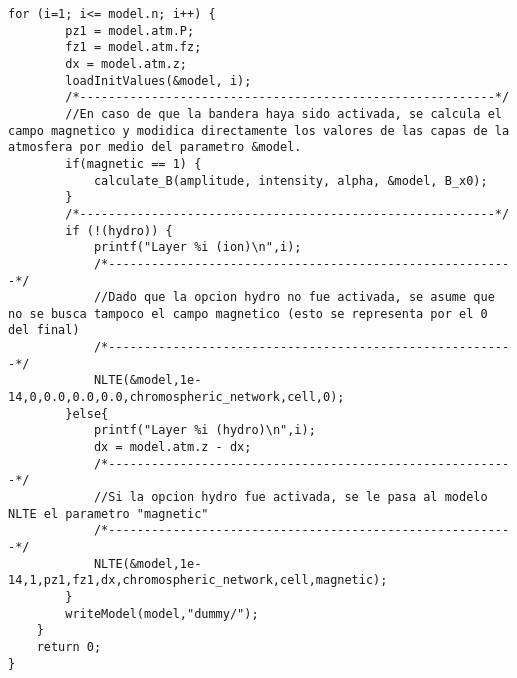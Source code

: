 \begin{lstlisting}[style=CStyle]
	for (i=1; i<= model.n; i++) {
		pz1 = model.atm.P;
		fz1 = model.atm.fz;
		dx = model.atm.z;
		loadInitValues(&model, i);
		/*----------------------------------------------------------*/	
		//En caso de que la bandera haya sido activada, se calcula el campo magnetico y modidica directamente los valores de las capas de la atmosfera por medio del parametro &model.
		if(magnetic == 1) {
			calculate_B(amplitude, intensity, alpha, &model, B_x0);
		}
		/*----------------------------------------------------------*/	
		if (!(hydro)) {
			printf("Layer %i (ion)\n",i);
			/*---------------------------------------------------------*/	
			//Dado que la opcion hydro no fue activada, se asume que no se busca tampoco el campo magnetico (esto se representa por el 0 del final)
			/*---------------------------------------------------------*/	
			NLTE(&model,1e-14,0,0.0,0.0,0.0,chromospheric_network,cell,0);
		}else{
			printf("Layer %i (hydro)\n",i);
			dx = model.atm.z - dx;
			/*---------------------------------------------------------*/	
			//Si la opcion hydro fue activada, se le pasa al modelo NLTE el parametro "magnetic"
			/*---------------------------------------------------------*/	
			NLTE(&model,1e-14,1,pz1,fz1,dx,chromospheric_network,cell,magnetic);
		}
		writeModel(model,"dummy/");
	}
	return 0;
}
\end{lstlisting}

